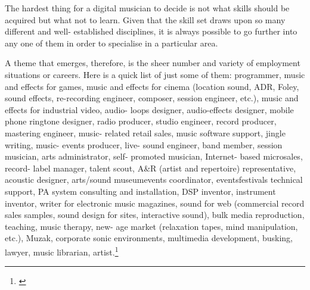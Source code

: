 {%




    

 




\begin{citacao}


The hardest thing for a digital musician to decide is not what skills should be acquired but what not to learn. Given that the skill set draws upon so many different and well- established disciplines, it is always possible to go further into any one of them in order to specialise in a particular area. 


A theme that emerges, therefore, is the sheer number and variety of employment situations or careers. Here is a quick list of just some of them: programmer, music and effects for games, music and effects for cinema (location sound, ADR, Foley, sound effects, re-recording engineer, composer, session engineer, etc.), music and effects for industrial video, audio- loops designer, audio-effects designer, mobile phone ringtone designer, radio producer, studio engineer, record producer, mastering engineer, music- related retail sales, music software support, jingle writing, music- events producer, live- sound engineer, band member, session musician, arts administrator, self- promoted musician, Internet- based microsales, record- label manager, talent scout, A\&R (artist and repertoire) representative, acoustic designer, arts/sound museum\/events coordinator, events\/festivals technical support, PA system consulting and installation, DSP inventor, instrument inventor, writer for electronic music magazines, sound for web (commercial record sales samples, sound design for sites, interactive sound), bulk media reproduction, teaching, music therapy, new- age market (relaxation tapes, mind manipulation, etc.), Muzak, corporate sonic environments, multimedia development, busking, lawyer, music librarian, artist.\footnote{\cite[191]{Hugill2012}}
\end{citacao}


}
